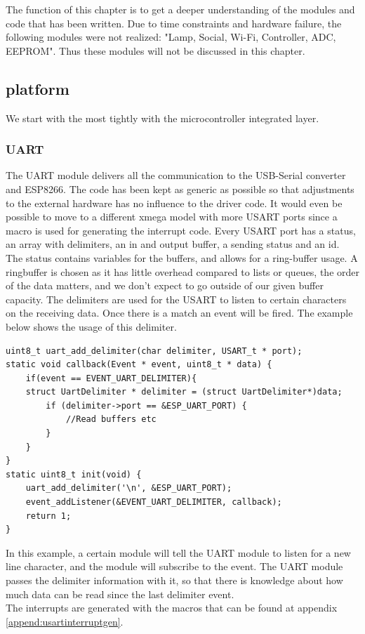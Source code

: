 The function of this chapter is to get a deeper understanding of the modules and code that has been written. Due to time constraints and hardware failure, the following modules were not realized: "Lamp, Social, Wi-Fi, Controller, ADC, EEPROM". Thus these modules will not be discussed in this chapter. 
\subsection{platform}
We start with the most tightly with the microcontroller integrated layer.
\subsubsection{UART}
The UART module delivers all the communication to the USB-Serial converter and ESP8266. The code has been kept as generic as possible so that adjustments to the external hardware has no influence to the driver code. It would even be possible to move to a different xmega model with more USART ports since a macro is used for generating the interrupt code. Every USART port has a status, an array with delimiters, an in and output buffer, a sending status and an id. The status contains variables for the buffers, and allows for a ring-buffer usage. A ringbuffer is chosen as it has little overhead compared to lists or queues, the order of the data matters, and we don't expect to go outside of our given buffer capacity. The delimiters are used for the USART to listen to certain characters on the receiving data. Once there is a match an event will be fired. The example below shows the usage of this delimiter.
\begin{verbatim}
uint8_t uart_add_delimiter(char delimiter, USART_t * port);
static void callback(Event * event, uint8_t * data) {
	if(event == EVENT_UART_DELIMITER){
	struct UartDelimiter * delimiter = (struct UartDelimiter*)data;
		if (delimiter->port == &ESP_UART_PORT) {
			//Read buffers etc
		}
	}
}
static uint8_t init(void) {
	uart_add_delimiter('\n', &ESP_UART_PORT);
	event_addListener(&EVENT_UART_DELIMITER, callback);
	return 1;
}
\end{verbatim}
In this example, a certain module will tell the UART module to listen for a new line character, and the module will subscribe to the event. The UART module passes the delimiter information with it, so that there is knowledge about how much data can be read since the last delimiter event.\\ 
The interrupts are generated with the macros that can be found at appendix \ref{append:usartinterruptgen}.
